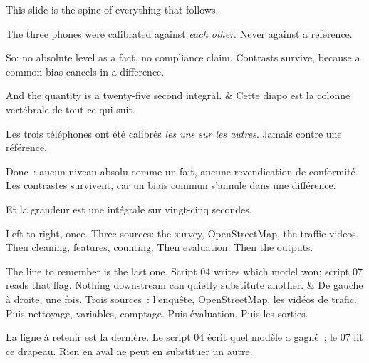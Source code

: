\documentclass[10pt,a4paper]{article}
\begin{document}
\begin{say}
This slide is the spine of everything that follows.

The three phones were calibrated against \emph{each other}. Never against a
reference. 

So: no absolute level as a fact, no compliance claim. Contrasts survive, because
a common bias cancels in a difference.

And the quantity is a twenty-five second integral. 
&
Cette diapo est la colonne vertébrale de tout ce qui suit.

Les trois téléphones ont été calibrés \emph{les uns sur les autres}. Jamais contre
une référence. 

Donc~: aucun niveau absolu comme un fait, aucune revendication de conformité. Les
contrastes survivent, car un biais commun s'annule dans une différence.

Et la grandeur est une intégrale sur vingt-cinq secondes. 
\end{say}

\begin{say}
Left to right, once. Three sources: the survey, OpenStreetMap, the traffic
videos. Then cleaning, features, counting. Then evaluation. Then the outputs.

The line to remember is the last one.  Script 04 writes which model won; script 07 reads that flag.
Nothing downstream can quietly substitute another.
&
De gauche à droite, une fois. Trois sources~: l'enquête, OpenStreetMap, les vidéos
de trafic. Puis nettoyage, variables, comptage. Puis évaluation. Puis les sorties.

La ligne à retenir est la dernière.  Le script 04 écrit quel modèle a gagné~; le 07 lit ce drapeau. Rien
en aval ne peut en substituer un autre.
\end{say}
\end{document}
